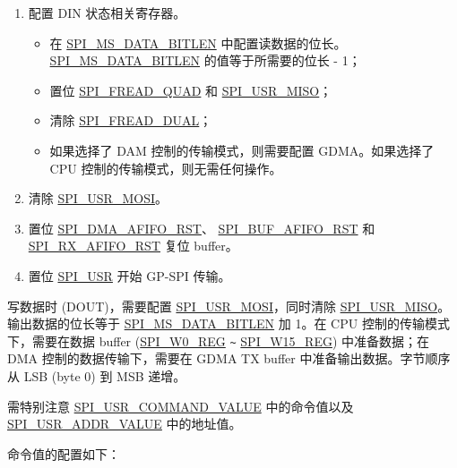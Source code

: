 \documentclass[main\_\_CN.tex]{subfiles}
\begin{document}
\begin{enumerate}
    \item 配置 DIN 状态相关寄存器。
        \begin{itemize}
            \item 在  \hyperref[fielddesc:SPIMSDATABITLEN]{SPI\_MS\_DATA\_BITLEN} 中配置读数据的位长。 \hyperref[fielddesc:SPIMSDATABITLEN]{SPI\_MS\_DATA\_BITLEN} 的值等于所需要的位长 - 1；
            \item 置位  \hyperref[fielddesc:SPIFREADQUAD]{SPI\_FREAD\_QUAD} 和  \hyperref[fielddesc:SPIUSRMISO]{SPI\_USR\_MISO}；
            \item 清除  \hyperref[fielddesc:SPIFREADDUAL]{SPI\_FREAD\_DUAL}；
            \item 如果选择了 DAM 控制的传输模式，则需要配置 GDMA。如果选择了 CPU 控制的传输模式，则无需任何操作。
        \end{itemize}

    \item 清除  \hyperref[fielddesc:SPIUSRMOSI]{SPI\_USR\_MOSI}。
    \item 置位  \hyperref[fielddesc:SPIDMAAFIFORST]{SPI\_DMA\_AFIFO\_RST}、 \hyperref[fielddesc:SPIBUFAFIFORST]{SPI\_BUF\_AFIFO\_RST} 和  \hyperref[fielddesc:SPIRXAFIFORST]{SPI\_RX\_AFIFO\_RST} 复位 buffer。

    \item 置位  \hyperref[fielddesc:SPIUSR]{SPI\_USR} 开始 GP-SPI 传输。
\end{enumerate}

写数据时 (DOUT)，需要配置  \hyperref[fielddesc:SPIUSRMOSI]{SPI\_USR\_MOSI}，同时清除  \hyperref[fielddesc:SPIUSRMISO]{SPI\_USR\_MISO}。输出数据的位长等于  \hyperref[fielddesc:SPIMSDATABITLEN]{SPI\_MS\_DATA\_BITLEN} 加 1。在 CPU 控制的传输模式下，需要在数据 buffer (\hyperref[regdesc:SPIW0REG]{SPI\_W0\_REG} \verb+~+ \hyperref[regdesc:SPIW15REG]{SPI\_W15\_REG}) 中准备数据；在 DMA 控制的数据传输下，需要在 GDMA TX buffer 中准备输出数据。字节顺序从 LSB (byte 0) 到 MSB 递增。

需特别注意  \hyperref[fielddesc:SPIUSRCOMMANDVALUE]{SPI\_USR\_COMMAND\_VALUE} 中的命令值以及  \hyperref[fielddesc:SPIUSRADDRVALUE]{SPI\_USR\_ADDR\_VALUE} 中的地址值。

命令值的配置如下：
\end{document}
